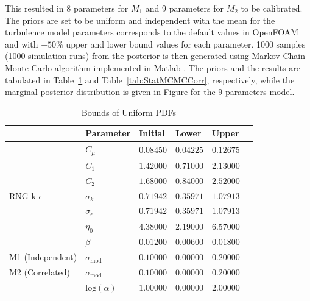 \documentclass[11pt,titlepage]{article}
\begin{document}
This resulted in 8 parameters for $M_1$ and 9 parameters for $M_2$ to be calibrated. 
The priors are set to be uniform and independent with the mean for the turbulence model parameters corresponds to the default values in OpenFOAM and with $\pm50\%$ upper and lower bound values for each parameter. 
1000 samples (1000 simulation runs) from the posterior is then generated using Markov Chain Monte Carlo algorithm implemented in Matlab \cite{Haario2006}. 
The priors and the results are tabulated in Table~\ref{tab:BoundsOfUniformPDFs} and Table~\ref{tab:StatMCMCCorr}, respectively, while the marginal posterior distribution is given in Figure for the 9 parameters model.
\begin{table}[htbp]
	\centering
		\caption{Bounds of Uniform PDFs}
		\begin{tabular}{l l l l l l}
			\hline \hline
												&	Parameter										& Initial 	& Lower			& Upper 		\\
			\hline
												& $C_\mu$											& $0.08450$ & $0.04225$ & $0.12675$ \\
												& $C_1$												& $1.42000$ & $0.71000$ & $2.13000$ \\
										  	& $C_2$												& $1.68000$ & $0.84000$ & $2.52000$ \\
			RNG k-$\epsilon$ 	& $\sigma_k$									& $0.71942$ & $0.35971$ & $1.07913$ \\
										  	& $\sigma_\epsilon$					  & $0.71942$ & $0.35971$ & $1.07913$ \\
										  	& $\eta_0$										& $4.38000$ & $2.19000$ & $6.57000$ \\
										  	& $\beta$							   			& $0.01200$ & $0.00600$ & $0.01800$ \\
			M1 (Independent)	& $\sigma_{\text{mod}}$				& $0.10000$ & $0.00000$ & $0.20000$ \\
			M2 (Correlated)		& $\sigma_{\text{mod}}$				& $0.10000$ & $0.00000$ & $0.20000$ \\
										  	& $\text{log}(\alpha)$				& $1.00000$ & $0.00000$ & $2.00000$ \\
			\hline
		\end{tabular}
	\label{tab:BoundsOfUniformPDFs}
\end{table}
\end{document}
